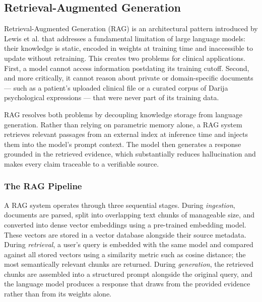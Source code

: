 \documentclass[a4paper,12pt]{report}
\begin{document}
\subsection{Retrieval-Augmented Generation}
\label{subsec:RAG}

Retrieval-Augmented Generation (RAG) is an architectural pattern introduced by Lewis et al. \cite{Lewis2020} that addresses a fundamental limitation of large language models: their knowledge is static, encoded in weights at training time and inaccessible to update without retraining. This creates two problems for clinical applications. First, a model cannot access information postdating its training cutoff. Second, and more critically, it cannot reason about private or domain-specific documents --- such as a patient's uploaded clinical file or a curated corpus of Darija psychological expressions --- that were never part of its training data.

RAG resolves both problems by decoupling knowledge storage from language generation. Rather than relying on parametric memory alone, a RAG system retrieves relevant passages from an external index at inference time and injects them into the model's prompt context. The model then generates a response grounded in the retrieved evidence, which substantially reduces hallucination and makes every claim traceable to a verifiable source.

\subsubsection{The RAG Pipeline}

A RAG system operates through three sequential stages. During \emph{ingestion}, documents are parsed, split into overlapping text chunks of manageable size, and converted into dense vector embeddings using a pre-trained embedding model. These vectors are stored in a vector database alongside their source metadata. During \emph{retrieval}, a user's query is embedded with the same model and compared against all stored vectors using a similarity metric such as cosine distance; the most semantically relevant chunks are returned. During \emph{generation}, the retrieved chunks are assembled into a structured prompt alongside the original query, and the language model produces a response that draws from the provided evidence rather than from its weights alone.
\end{document}
